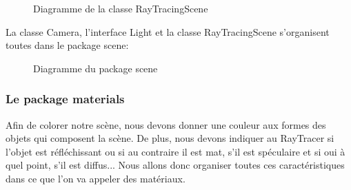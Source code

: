 \documentclass[11pt]{article}
\begin{document}
\begin{figure}[h!]
	
	\caption{Diagramme de la classe RayTracingScene}
	\label{diagrammeRayTracingScene}
\end{figure}
\FloatBarrier

La classe Camera, l'interface Light et la classe RayTracingScene s'organisent toutes dans le package scene:

\begin{figure}[h!]
	
	\caption{Diagramme du package scene}
	\label{diagrammePackageScene}
\end{figure}
\FloatBarrier

\subsubsection{Le package materials}

Afin de colorer notre scène, nous devons donner une couleur aux formes des objets qui composent la scène. De plus, nous devons indiquer au RayTracer si l'objet est réfléchissant ou si au contraire il est mat, s'il est spéculaire et si oui à quel point, s'il est diffus...
Nous allons donc organiser toutes ces caractéristiques dans ce que l'on va appeler des matériaux.
\end{document}
